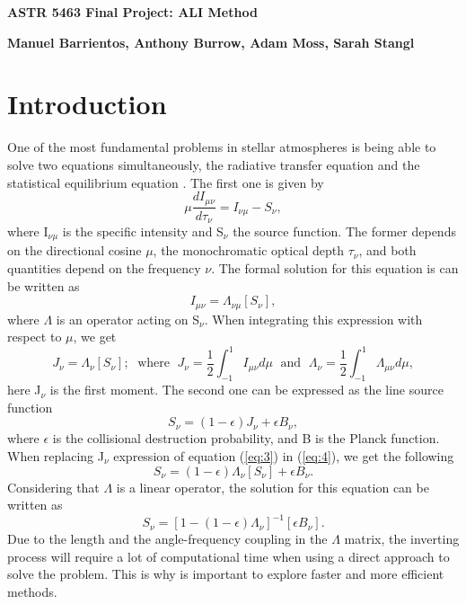 \documentclass[12pt]{article}
\begin{document}
\begin{center}\begin{LARGE}
\textbf{ASTR 5463 Final Project: ALI Method}
\end{LARGE}\end{center}

\begin{center}
\textbf{Manuel Barrientos, Anthony Burrow, Adam Moss, Sarah Stangl}
\end{center}

\section{Introduction}
One of the most fundamental problems in stellar atmospheres is being able to solve two equations simultaneously, the radiative transfer equation and the statistical equilibrium equation \citep[e.g.,][]{OandK1987,hubeny2003}. The first one is given by
\begin{equation}
    \mu \frac{d I_{\mu \nu}}{d \tau_{\nu}}= I_{\nu \mu} - S_{\nu},
\label{eq:1}
\end{equation}
where I$_{\nu \mu}$ is the specific intensity and S$_{\nu}$ the source function. The former depends on the directional cosine $\mu$, the monochromatic optical depth $\tau_{\nu}$, and both quantities depend on the frequency $\nu$. The formal solution for this equation is can be written as
\begin{equation}
    I_{\mu \nu} = \Lambda_{\nu \mu}[S_{\nu}],
\label{eq:2}
\end{equation}
where $\Lambda$ is an operator acting on S$_{\nu}$. When integrating this expression with respect to $\mu$, we get
\begin{equation}
    J_{\nu} = \Lambda_{\nu}[S_{\nu}]; \; \text{ where } \; J_{\nu}= \frac{1}{2}\int_{-1}^{1} I_{\mu \nu} d \mu \; \text{ and } \;\Lambda_{\nu}= \frac{1}{2} \int_{-1}^{1} \Lambda_{\mu \nu} d\mu,
\label{eq:3}
\end{equation}
here J$_{\nu}$ is the first moment. The second one can be expressed as the line source function
\begin{equation}
    S_{\nu}= (1 - \epsilon)J_{\nu} + \epsilon B_{\nu},
\label{eq:4}
\end{equation}
where $\epsilon$ is the collisional destruction probability, and B is the Planck function. When replacing J$_{\nu}$ expression of equation (\ref{eq:3}) in (\ref{eq:4}), we get the following
\begin{equation}
   S_{\nu}= (1 - \epsilon)\Lambda_{\nu}[S_{\nu}] + \epsilon B_{\nu}.
\end{equation}
Considering that $\Lambda$ is a linear operator, the solution for this equation can be written as
\begin{equation}
   S_{\nu}= [1 - (1 - \epsilon)
   \Lambda_{\nu}]^{-1}[\epsilon B_{\nu}].
\end{equation}
Due to the length and the angle-frequency coupling in the $\Lambda$ matrix, the inverting process will require a lot of computational time when using a direct approach to solve the problem. This is why is important to explore faster and more efficient methods.
\end{document}
